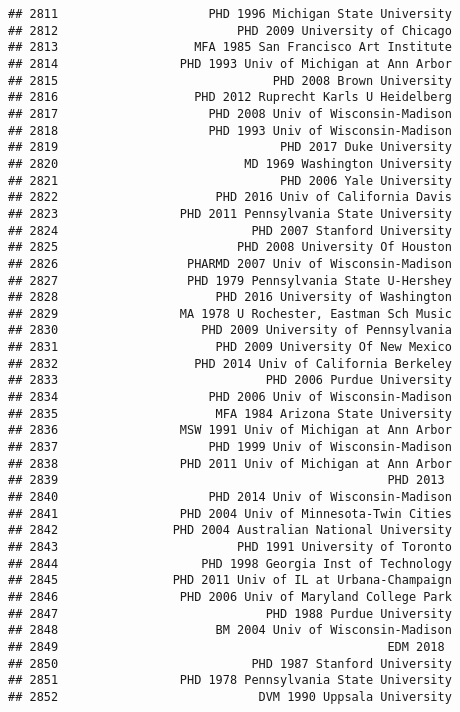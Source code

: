 \documentclass[
]{article}
\begin{document}
\begin{verbatim}
## 2811                     PHD 1996 Michigan State University
## 2812                         PHD 2009 University of Chicago
## 2813                   MFA 1985 San Francisco Art Institute
## 2814                 PHD 1993 Univ of Michigan at Ann Arbor
## 2815                              PHD 2008 Brown University
## 2816                   PHD 2012 Ruprecht Karls U Heidelberg
## 2817                     PHD 2008 Univ of Wisconsin-Madison
## 2818                     PHD 1993 Univ of Wisconsin-Madison
## 2819                               PHD 2017 Duke University
## 2820                          MD 1969 Washington University
## 2821                               PHD 2006 Yale University
## 2822                      PHD 2016 Univ of California Davis
## 2823                 PHD 2011 Pennsylvania State University
## 2824                           PHD 2007 Stanford University
## 2825                         PHD 2008 University Of Houston
## 2826                  PHARMD 2007 Univ of Wisconsin-Madison
## 2827                  PHD 1979 Pennsylvania State U-Hershey
## 2828                      PHD 2016 University of Washington
## 2829                 MA 1978 U Rochester, Eastman Sch Music
## 2830                    PHD 2009 University of Pennsylvania
## 2831                      PHD 2009 University Of New Mexico
## 2832                   PHD 2014 Univ of California Berkeley
## 2833                             PHD 2006 Purdue University
## 2834                     PHD 2006 Univ of Wisconsin-Madison
## 2835                      MFA 1984 Arizona State University
## 2836                 MSW 1991 Univ of Michigan at Ann Arbor
## 2837                     PHD 1999 Univ of Wisconsin-Madison
## 2838                 PHD 2011 Univ of Michigan at Ann Arbor
## 2839                                              PHD 2013 
## 2840                     PHD 2014 Univ of Wisconsin-Madison
## 2841                 PHD 2004 Univ of Minnesota-Twin Cities
## 2842                PHD 2004 Australian National University
## 2843                         PHD 1991 University of Toronto
## 2844                    PHD 1998 Georgia Inst of Technology
## 2845                PHD 2011 Univ of IL at Urbana-Champaign
## 2846                 PHD 2006 Univ of Maryland College Park
## 2847                             PHD 1988 Purdue University
## 2848                      BM 2004 Univ of Wisconsin-Madison
## 2849                                              EDM 2018 
## 2850                           PHD 1987 Stanford University
## 2851                 PHD 1978 Pennsylvania State University
## 2852                            DVM 1990 Uppsala University

\end{verbatim}
\end{document}
